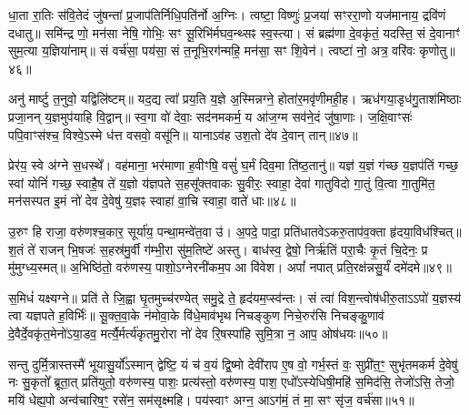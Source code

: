{\anuvakamend[{रू॒पेण॑ सद॒स्यै॑र॒ष्टाद॑श च॥43 (37)॥}]}

धा॒ता रा॒तिः स॑वि॒तेदं जु॑षन्तां प्र॒जाप॑तिर्निधि॒पति॑र्नो अ॒ग्निः। त्वष्टा॒ विष्णुः॑ प्र॒जया॑ सꣳररा॒णो यज॑मानाय॒ द्रवि॑णं दधातु॥ समि॑न्द्र णो॒ मन॑सा नेषि॒ गोभिः॒ सꣳ सू॒रिभि॑र्मघव॒न्थ्सꣴ स्व॒स्त्या। सं ब्रह्म॑णा दे॒वकृ॑तं॒ यदस्ति॒ सं दे॒वानाꣳ॑ सुम॒त्या य॒ज्ञिया॑नाम्॥ सं वर्च॑सा॒ पय॑सा॒ सं त॒नूभि॒रग॑न्महि॒ मन॑सा॒ सꣳ शि॒वेन॑। त्वष्टा॑ नो॒ अत्र॒ वरि॑वः कृणोतु॥४६॥

अनु॑ मार्ष्टु त॒नुवो॒ यद्विलि॑ष्टम्॥ यद॒द्य त्वा᳚ प्रय॒ति य॒ज्ञे अ॒स्मिन्नग्ने॒ होता॑र॒मवृ॑णीमही॒ह। ऋध॑गया॒डृध॑गु॒ताश॑मिष्ठाः प्रजा॒नन् य॒ज्ञमुप॑याहि वि॒द्वान्॥ स्व॒गा वो॑ देवाः॒ सद॑नमकर्म॒ य आ॑ज॒ग्म सव॑ने॒दं जु॑षा॒णाः। ज॒क्षि॒वाꣳसः॑ पपि॒वाꣳस॑श्च॒ विश्वे॒\-ऽस्मे ध॑त्त वसवो॒ वसू॑नि॥ याना\-ऽव॑ह उश॒तो दे॑व दे॒वान् तान्॥४७॥

प्रेर॑य॒ स्वे अ॑ग्ने स॒धस्थे᳚। वह॑माना॒ भर॑माणा ह॒वीꣳषि॒ वसुं॑ घ॒र्मं दिव॒मा ति॑ष्ठ॒तानु॑॥ यज्ञ॑ य॒ज्ञं ग॑च्छ य॒ज्ञप॑तिं गच्छ॒ स्वां योनिं॑ गच्छ॒ स्वाहै॒ष ते॑ य॒ज्ञो य॑ज्ञपते स॒हसू᳚क्तवाकः सु॒वीरः॒ स्वाहा॒ देवा॑ गातुविदो गा॒तुं वि॒त्वा गा॒तुमि॑त॒ मन॑सस्पत इ॒मं नो॑ देव दे॒वेषु॑ य॒ज्ञꣴ स्वाहा॑ वा॒चि स्वाहा॒ वाते॑ धाः॥४८॥

{\anuvakamend[{कृ॒णो॒तु॒ तान॒ष्टाच॑त्वारिꣳशच्च॥44 (38)॥}]}

उ॒रुꣳ हि राजा॒ वरु॑णश्च॒कार॒ सूर्या॑य॒ पन्था॒मन्वे॑त॒वा उ॑। अ॒पदे॒ पादा॒ प्रति॑धातवे\-ऽकरु॒ताप॑व॒क्ता हृ॑दया॒विध॑श्चित्॥ श॒तं ते॑ राजन् भि॒षजः॑ स॒हस्र॑मु॒र्वी ग॑म्भी॒रा सु॑म॒तिष्टे॑ अस्तु। बाध॑स्व॒ द्वेषो॒ निर्\mbox{}ऋ॑तिं परा॒चैः कृ॒तं चि॒देनः॒ प्र मु॑मुग्ध्य॒स्मत्॥ अ॒भिष्ठि॑तो॒ वरु॑णस्य॒ पाशो॒\-ऽग्नेरनी॑कम॒प आ वि॑वेश। अपां᳚ नपात् प्रति॒रक्ष॑न्नसु॒र्यं॑ दमे॑दमे॥४९॥

स॒मिधं॑ यक्ष्यग्ने॥ प्रति॑ ते जि॒ह्वा घृ॒तमुच्च॑रण्येत् समु॒द्रे ते॒ हृद॑यम॒प्स्व॑न्तः। सं त्वा॑ विश॒न्त्वोष॑धीरु॒ता\-ऽ\-ऽपो॑ य॒ज्ञस्य॑ त्वा यज्ञपते ह॒विर्भिः॑॥ सू॒क्त॒वा॒के न॑मोवा॒के वि॑धे॒माव॑भृथ निचङ्कुण निचे॒रुर॑सि निचङ्कु॒णाव॑ दे॒वैर्दे॒वकृ॑त॒मेनो॑\-ऽया॒डव॒ मर्त्यै॒र्मर्त्य॑कृतमु॒रोरा नो॑ देव रि॒षस्पा॑हि सुमि॒त्रा न॒ आप॒ ओष॑धयः॥५०॥

सन्तु दुर्मि॒त्रास्तस्मै॑ भूयासु॒र्यो᳚\-ऽस्मान् द्वेष्टि॒ यं च॑ व॒यं द्वि॒ष्मो देवी॑राप ए॒ष वो॒ गर्भ॒स्तं वः॒ सुप्री॑त॒ꣳ॒ सुभृ॑तमकर्म दे॒वेषु॑ नः सु॒कृतो᳚ ब्रूता॒त् प्रति॑युतो॒ वरु॑णस्य॒ पाशः॒ प्रत्य॑स्तो॒ वरु॑णस्य॒ पाश॒ एधो᳚\-ऽस्येधिषी॒महि॑ स॒मिद॑सि॒ तेजो॑\-ऽसि॒ तेजो॒ मयि॑ धेह्य॒पो अन्व॑चारिष॒ꣳ॒ रसे॑न॒ सम॑सृक्ष्महि। पय॑स्वाꣳ अग्न॒ आ\-ऽग॑मं॒ तं मा॒ सꣳ सृ॑ज॒ वर्च॑सा॥५१॥

